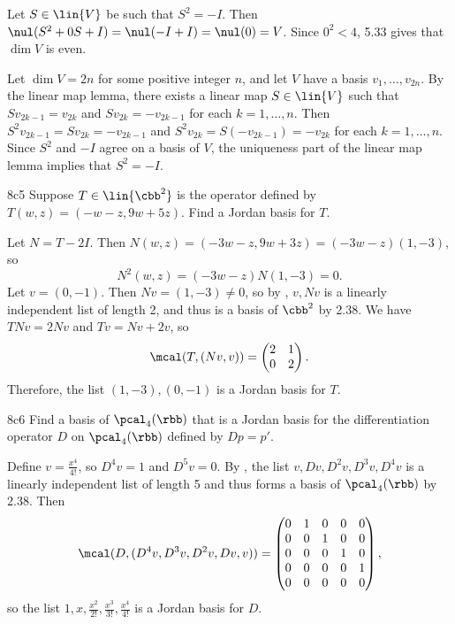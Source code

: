 \begin{soliff}
    \rightimp Let $S \in \lin{V}$ be such that $S^2 = -I$.
    Then $\nul(S^2 + 0S + I) = \nul(-I + I) = \nul(0) = V$.
    Since $0^2 < 4$, 5.33 gives that $\dim V$ is even.

    \leftimp Let $\dim V = 2n$ for some positive integer $n$, and let $V$ have a basis $v_1, \ldots, v_{2n}$.
    By the linear map lemma, there exists a linear map $S \in \lin{V}$ such that $S v_{2k-1} = v_{2k}$ and $S v_{2k} = -v_{2k-1}$ for each $k = 1, \ldots, n$.
    Then $S^2 v_{2k-1} = S v_{2k} = -v_{2k-1}$ and $S^2 v_{2k} = S(-v_{2k-1}) = -v_{2k}$ for each $k = 1, \ldots, n$.
    Since $S^2$ and $-I$ agree on a basis of $V$, the uniqueness part of the linear map lemma implies that $S^2 = -I$.
\end{soliff}

\begin{exercise}{8c5}
    Suppose $T \in \lin{\cbb^2}$ is the operator defined by $T(w, z) = (-w - z, 9w + 5z)$.
    Find a Jordan basis for $T$.
\end{exercise}

\begin{sol}
    Let $N = T - 2I$.
    Then $N(w, z) = (-3w - z, 9w + 3z) = (-3w - z)(1, -3)$, so
    \[
        N^2(w, z) = (-3w - z) N(1, -3) = 0.
    \]
    Let $v = (0, -1)$.
    Then $N v = (1, -3) \neq 0$, so by , $v, Nv$ is a linearly independent list of length 2, and thus is a basis of $\cbb^2$ by 2.38.
    We have $T N v = 2 N v$ and $T v = N v + 2 v$, so
    \[
        \mcal(T, (Nv, v)) =
        \begin{pmatrix}
            2 & 1 \\
            0 & 2
        \end{pmatrix}.
    \]
    Therefore, the list $(1, -3), (0, -1)$ is a Jordan basis for $T$.
\end{sol}

\begin{exercise}{8c6}
    Find a basis of $\pcal_4(\rbb)$ that is a Jordan basis for the differentiation operator $D$ on $\pcal_4(\rbb)$ defined by $Dp = p'$.
\end{exercise}

\begin{sol}
    Define $v = \frac{x^4}{4!}$, so $D^4 v = 1$ and $D^5 v = 0$.
    By , the list $v, Dv, D^2 v, D^3 v, D^4 v$ is a linearly independent list of length 5 and thus forms a basis of $\pcal_4(\rbb)$ by 2.38.
    Then
    \[
        \mcal(D, (D^4 v, D^3 v, D^2 v, Dv, v)) =
        \begin{pmatrix}
            0 & 1 & 0 & 0 & 0 \\
            0 & 0 & 1 & 0 & 0 \\
            0 & 0 & 0 & 1 & 0 \\
            0 & 0 & 0 & 0 & 1 \\
            0 & 0 & 0 & 0 & 0
        \end{pmatrix},
    \]
    so the list $1, x, \frac{x^2}{2!}, \frac{x^3}{3!}, \frac{x^4}{4!}$ is a Jordan basis for $D$.
\end{sol}

